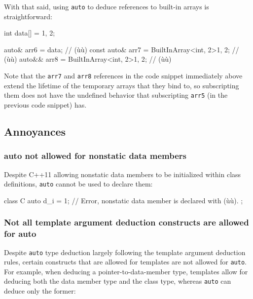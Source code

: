 With that said, using \lstinline!auto! to deduce
references to built-in arrays is straightforward:

\begin{emcppslisting}[emcppsbatch=e21]
int data[] = {1, 2};

      auto&  arr6 = data;                        //       (ù{}ù)
const auto&  arr7 = BuiltInArray<int, 2>{1, 2};  // (ù{}ù)
      auto&& arr8 = BuiltInArray<int, 2>{1, 2};  //       (ù{}ù)
\end{emcppslisting}

\noindent Note that the \lstinline!arr7! and \lstinline!arr8! references in the code snippet immediately above extend
the lifetime of the temporary arrays that they bind to, so subscripting
them does not have the undefined behavior that subscripting
\lstinline!arr5! (in the previous code snippet) has.

\subsection[Annoyances]{Annoyances}\label{annoyances-auto}

\subsubsection[\lstinline!auto! not allowed for nonstatic data members]{{\SubsubsecCode auto} not allowed for nonstatic data members}\label{auto-not-allowed-for-non-static-data-members}

Despite C++11 allowing nonstatic data members to be initialized within
class definitions, \lstinline!auto! cannot be used to declare them:

\begin{emcppslisting}
class C
{
    auto d_i = 1;  // Error, nonstatic data member is declared with (ù{}ù).
};
\end{emcppslisting}


\subsubsection[Not all template argument deduction constructs are allowed for \lstinline!auto!]{Not all template argument deduction constructs are allowed for {\SubsubsecCode auto}}\label{not-all-template-argument-deduction-constructs-are-allowed-for-auto}

Despite \lstinline!auto! type deduction largely following the template
argument deduction rules, certain constructs that are allowed for
templates are not allowed for \lstinline!auto!. For example, when deducing
a pointer-to-data-member type, templates allow for deducing both the
data member type and the class type, whereas \lstinline!auto! can
deduce only the former:

